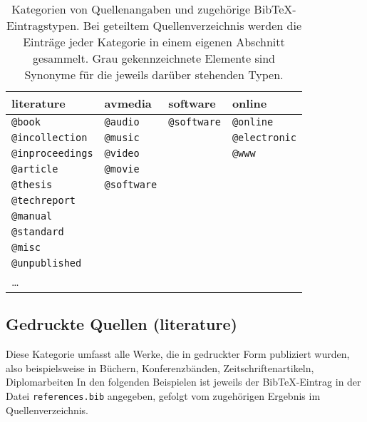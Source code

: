 \begin{table}
\caption{Kategorien von Quellenangaben und zugehörige BibTeX-Eintragstypen.
Bei geteiltem Quellenverzeichnis werden die Einträge jeder Kategorie in einem
eigenen Abschnitt gesammelt.
Grau gekennzeichnete Elemente sind Synonyme für die jeweils darüber stehenden Typen.}
\label{tab:BibKategorien}
\centering
{}
\setlength{\tabcolsep}{4mm}
\begin{tabular}{llll}
	\textsf{literature} & \textsf{avmedia} & \textsf{software} & \textsf{online} \\
	\hline
	\texttt{@book}          & \texttt{@audio}                & \texttt{@software} & \texttt{@online} \\
	\texttt{@incollection}  & \texttt{\color{midgray}@music} & & \texttt{\color{midgray}@electronic} \\
	\texttt{@inproceedings} & \texttt{@video}                & & \texttt{\color{midgray}@www} \\
	\texttt{@article}       & \texttt{@movie}                & &  \\
	\texttt{@thesis}        & \texttt{@software}             & &  \\
	\texttt{@techreport}    &  & &  \\
	\texttt{@manual}        &  & &  \\
	\texttt{@standard}        &  & &  \\
	\texttt{@misc}          &  & &  \\
	\texttt{@unpublished}          &  & &  \\
	\ldots                  &  & &  \\
	\hline
\end{tabular}
\end{table}


\subsection{Gedruckte Quellen (\textsf{literature})}
\label{sec:KategorieLiterature}

Diese Kategorie umfasst alle Werke, die in gedruckter Form publiziert wurden,
also beispielsweise in Büchern, Konferenzbänden, Zeitschriftenartikeln, Diplomarbeiten \usw
In den folgenden Beispielen ist jeweils der BibTeX-Eintrag in der Datei \nolinkurl{references.bib}
angegeben, gefolgt vom zugehörigen Ergebnis im Quellenverzeichnis.



